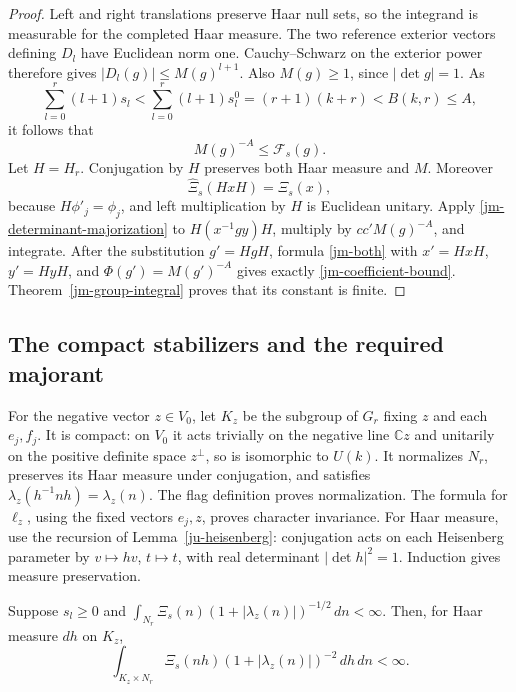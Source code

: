 \begin{proof}
Left and right translations preserve Haar null sets, so the
integrand is measurable for the completed Haar measure.
The two reference exterior vectors defining \(D_l\) have
Euclidean norm one.  Cauchy--Schwarz on the exterior power
therefore gives \(|D_l(g)|\leq M(g)^{l+1}\).
Also \(M(g)\geq1\), since \(|\det g|=1\).
As
\[
 \sum_{l=0}^{r}(l+1)s_l
   <\sum_{l=0}^{r}(l+1)s_l^0
       =(r+1)(k+r)<B(k,r)\leq A,
\]
it follows that
\begin{equation}\label{jm-determinant-majorization}
                         M(g)^{-A}\leq\mathcal F_s(g).
\end{equation}
Let \(H=H_r\).  Conjugation by \(H\) preserves both Haar
measure and \(M\).  Moreover
\[
                  \widehat\Xi_s(HxH)=\Xi_s(x),
\]
because \(H\phi'_j=\phi_j\), and left multiplication by
\(H\) is Euclidean unitary.
Apply \eqref{jm-determinant-majorization} to
\(H(x^{-1}gy)H\), multiply by \(cc'M(g)^{-A}\), and integrate.
After the substitution \(g'=HgH\), formula \eqref{jm-both}
with \(x'=HxH\), \(y'=HyH\), and \(\Phi(g')=M(g')^{-A}\)
gives exactly \eqref{jm-coefficient-bound}.
Theorem~\ref{jm-group-integral} proves that its constant is finite.
\end{proof}

\subsection{The compact stabilizers and the required majorant}

For the negative vector \(z\in V_0\), let \(K_z\) be the
subgroup of \(G_r\) fixing \(z\) and each \(e_j,f_j\).
It is compact: on \(V_0\) it acts trivially on the negative
line \(\mathbb Cz\) and unitarily on the positive definite
space \(z^\perp\), so is isomorphic to \(U(k)\).
It normalizes \(N_r\), preserves its Haar measure under
conjugation, and satisfies
\(\lambda_z(h^{-1}nh)=\lambda_z(n)\).
The flag definition proves normalization.
The formula for \(\ell_z\), using the fixed vectors \(e_j,z\),
proves character invariance.
For Haar measure, use the recursion of
Lemma~\ref{ju-heisenberg}: conjugation acts on each
Heisenberg parameter by \(v\mapsto hv\), \(t\mapsto t\),
with real determinant \(|\det h|^2=1\).
Induction gives measure preservation.

\begin{lemma}\label{jm-compact-stabilizer}
Suppose \(s_l\geq0\) and
\(\int_{N_r}\Xi_s(n)(1+|\lambda_z(n)|)^{-1/2}\,dn<\infty\).
Then, for Haar measure \(dh\) on \(K_z\),
\begin{equation}\label{jm-stabilizer-integral}
 \int_{K_z\times N_r}
       \Xi_s(nh)(1+|\lambda_z(n)|)^{-2}\,dh\,dn<\infty.
\end{equation}
\end{lemma}

